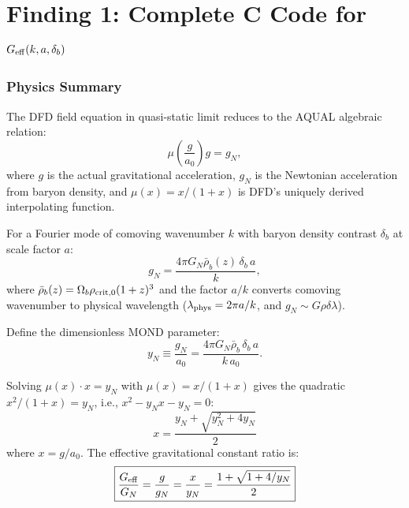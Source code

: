 \documentclass[11pt]{article}
\theoremstyle{definition}
\theoremstyle{remark}
\newcommand{\Geff}{G_{\rm eff}}
\begin{document}
\newpage
\tableofcontents
\newpage


\part{Finding 1: Complete C Code for $G_{\rm eff}(k,a,\delta_b)$}
\label{part:geff-code}

\section{Physics Summary}

The DFD field equation in quasi-static limit reduces to the AQUAL
algebraic relation:
\begin{equation}
\mu\!\left(\frac{g}{a_0}\right) g = g_N,
\label{eq:MOND-algebraic}
\end{equation}
where $g$ is the actual gravitational acceleration, $g_N$ is the Newtonian
acceleration from baryon density, and $\mu(x) = x/(1+x)$ is DFD's
uniquely derived interpolating function.

For a Fourier mode of comoving wavenumber $k$ with baryon density contrast
$\delta_b$ at scale factor $a$:
\begin{equation}
g_N = \frac{4\pi G_N \bar\rho_b(z) \,\delta_b \, a}{k},
\label{eq:gN-mode}
\end{equation}
where $\bar\rho_b(z) = \Omega_b \rho_{\rm crit,0} (1+z)^3$ and the
factor $a/k$ converts comoving wavenumber to physical wavelength
($\lambda_{\rm phys} = 2\pi a / k$, and $g_N \sim G\rho\delta\lambda$).

Define the dimensionless MOND parameter:
\begin{equation}
y_N \equiv \frac{g_N}{a_0} = \frac{4\pi G_N \bar\rho_b \,\delta_b\, a}{k\, a_0}.
\label{eq:yN-def}
\end{equation}

Solving $\mu(x)\cdot x = y_N$ with $\mu(x) = x/(1+x)$ gives the quadratic
$x^2/(1+x) = y_N$, i.e., $x^2 - y_N x - y_N = 0$:
\begin{equation}
\boxed{x = \frac{y_N + \sqrt{y_N^2 + 4y_N}}{2}}
\label{eq:x-solution}
\end{equation}
where $x = g/a_0$. The effective gravitational constant ratio is:
\begin{equation}
\boxed{\frac{\Geff}{G_N} = \frac{g}{g_N} = \frac{x}{y_N}
= \frac{1 + \sqrt{1 + 4/y_N}}{2}}
\label{eq:Geff-ratio}
\end{equation}
\end{document}
